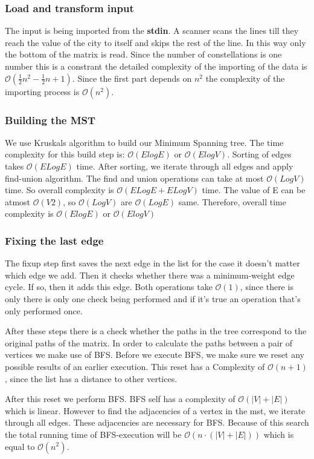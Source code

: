 \documentclass{article}
\newcommand{\bigO}[1]{\mathcal{O}(#1)}
\begin{document}
\subsubsection{Load and transform input}
The input is being imported from the \textbf{stdin}. A scanner scans the lines till they reach the value of the city to itself and skips the rest of the line. In this way only the bottom of the matrix is read. Since the number of constellations is one number this is a constrant the detailed complexity of the importing of the data is $\bigO{\frac{1}{2}n^2 - \frac{1}{2}n + 1}$. Since the first part depends on $n^2$ the complexity of the importing process is $\bigO{n^2}$.

\subsubsection{Building the MST}
We use Kruskals algorithm to build our Minimum Spanning tree. The time complexity for this build step is: $\bigO{ElogE}$ or $\bigO{ElogV}$. Sorting of edges takes $\bigO{ELogE}$ time. After sorting, we iterate through all edges and apply find-union algorithm. The find and union operations can take at most $\bigO{LogV}$ time. So overall complexity is $\bigO{ELogE + ELogV}$ time. The value of E can be atmost $\bigO{V2}$, so $\bigO{LogV}$ are $\bigO{LogE}$ same. Therefore, overall time complexity is $\bigO{ElogE}$ or $\bigO{ElogV}$

\subsubsection{Fixing the last edge}
The fixup step first saves the next edge in the list for the case it doesn't matter which edge we add. Then it checks whether there was a minimum-weight edge cycle. If so, then it adds this edge. Both operations take $\bigO{1}$, since there is only there is only one check being performed and if it's true an operation that's only performed once.

After these steps there is a check whether the paths in the tree correspond to the original paths of the matrix. In order to calculate the paths between a pair of vertices we make use of BFS. Before we execute BFS, we make sure we reset any possible results of an earlier execution. This reset has a Complexity of $\bigO{n + 1}$, since the list has a distance to other vertices.

After this reset we perform BFS. BFS self has a complexity of $\bigO{|V| + |E|}$ which is linear. However to find the adjacencies of a vertex in the mst, we iterate through all edges. These adjacencies are necessary for BFS. Because of this search the total running time of BFS-execution will be $\bigO{n \cdot (|V| + |E|)}$ which is equal to $\bigO{n^2}$.
\end{document}
